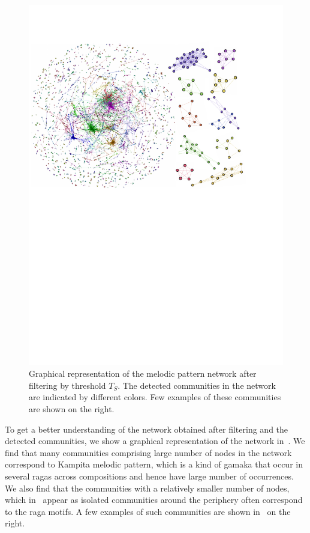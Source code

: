 \begin{figure}
	\begin{center}
		\includegraphics[width=\figSizeHundred]{ch06_patterns/figures/Characterization/networkWithClusters.pdf}
	\end{center}
 \caption{Graphical representation of the melodic pattern network after filtering by threshold $T_S$. The detected communities in the network are indicated by different colors. Few examples of these communities are shown on the right.}
 \label{fig:network_and_communities_pattern_characterization}
\end{figure}

To get a better understanding of the network obtained after filtering and the detected communities, we show a graphical representation of the network in~. We find that many communities comprising large number of nodes in the network correspond to Kampita melodic pattern, which is a kind of \gls{gamaka} that occur in several \glspl{raga} across compositions and hence have large number of occurrences. We also find that the communities with a relatively smaller number of nodes, which in~ appear as isolated communities around the periphery often correspond to the \gls{raga} motifs. A few examples of such communities are shown in~ on the right.


